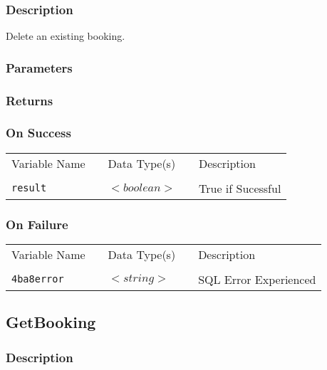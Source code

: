 \subsubsection{Description}

Delete an existing booking.

\subsubsection{Parameters}

\subsubsection{Returns}

\subsubsection{On Success}

\begin{tabular}{lllll}
Variable Name	&		&	Data Type(s)		&	&	Description	\\
				&	&	&	&	\\
\verb!result! & \hspace{15mm} & $<boolean>$ & \hspace{15mm} & True if Sucessful \\
\end{tabular}

\subsubsection{On Failure}

\begin{tabular}{lllll}
Variable Name	&		&	Data Type(s)		&	&	Description	\\
				&	&	&	&	\\
\verb!4ba8error! & \hspace{15mm} & $<string>$ & \hspace{15mm} & SQL Error Experienced \\
\end{tabular}


\subsection{GetBooking}

\subsubsection{Description}

